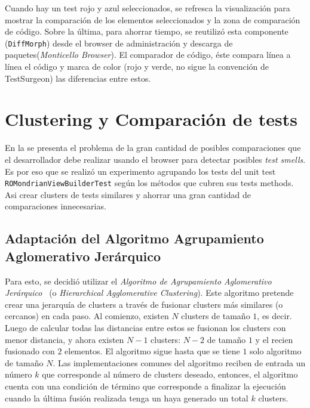 \par Cuando hay un test rojo y azul seleccionados, se refresca la visualización para mostrar la comparación de los elementos seleccionados y la zona de comparación de código. Sobre la última, para ahorrar tiempo, se reutilizó esta componente ({\tt DiffMorph}) desde el browser de administración y descarga de paquetes(\emph{Monticello Browser}). El comparador de código, éste compara línea a línea el código y marca de color (rojo y verde, no sigue la convención de TestSurgeon) las diferencias entre estos. 
\section{Clustering y Comparación de tests}

\par En la  se presenta el problema de la gran cantidad de posibles comparaciones que el desarrollador debe realizar usando el browser para detectar posibles \emph{test smells}. Es por eso que se realizó un experimento agrupando los tests del unit test {\tt ROMondrianViewBuilderTest} según los métodos que cubren sus tests methods. Asi crear clusters de tests similares y ahorrar una gran cantidad de comparaciones innecesarias.

\subsection{Adaptación del Algoritmo Agrupamiento Aglomerativo Jerárquico}

\par Para esto, se decidió utilizar el \emph{Algoritmo de Agrupamiento Aglomerativo Jerárquico}~\cite{defays1977efficient,sibson1973slink} (o \emph{Hierarchical Agglomerative Clustering}). Este algoritmo pretende crear una jerarquía de clusters a través de fusionar clusters más similares (o cercanos) en cada paso. Al comienzo, existen $N$ clusters de tamaño $1$, es decir. Luego de calcular todas las distancias entre estos se fusionan los clusters con menor distancia, y ahora existen $N-1$ clusters: $N-2$ de tamaño $1$ y el recien fusionado con $2$ elementos. El algoritmo sigue hasta que se tiene $1$ solo algoritmo de tamaño $N$. Las implementaciones comunes del algoritmo reciben de entrada un número $k$ que corresponde al número de clusters deseado, entonces, el algoritmo cuenta con una condición de término que corresponde a finalizar la ejecución cuando la última fusión realizada tenga un haya generado un total $k$ clusters.

